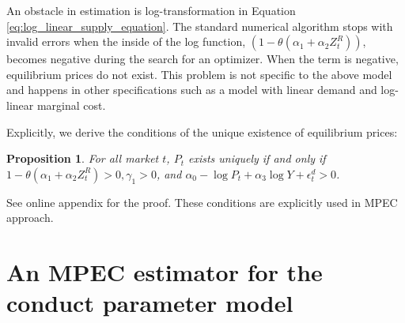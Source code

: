 \documentclass[11pt, a4paper]{article}
\newtheorem{proposition}{Proposition}
\begin{document}
An obstacle in estimation is log-transformation in Equation \eqref{eq:log_linear_supply_equation}.
The standard numerical algorithm stops with invalid errors when the inside of the log function, $(1 - \theta (\alpha_1 + \alpha_2 Z^{R}_{t}))$, becomes negative during the search for an optimizer.
When the term is negative, equilibrium prices do not exist. 
This problem is not specific to the above model and happens in other specifications such as a model with linear demand and log-linear marginal cost.

Explicitly, we derive the conditions of the unique existence of equilibrium prices:

\begin{proposition}
    For all market $t$, $P_{t}$ exists uniquely if and only if $1- \theta(\alpha_1 + \alpha_2 Z_{t}^{R}) >0, \gamma_1>0$, and $\alpha_0 - \log P_{t} + \alpha_3 \log Y + \epsilon_{t}^{d} > 0$.
\end{proposition}
See online appendix for the proof. These conditions are explicitly used in MPEC approach.





\section{An MPEC estimator for the conduct parameter model}
\end{document}
